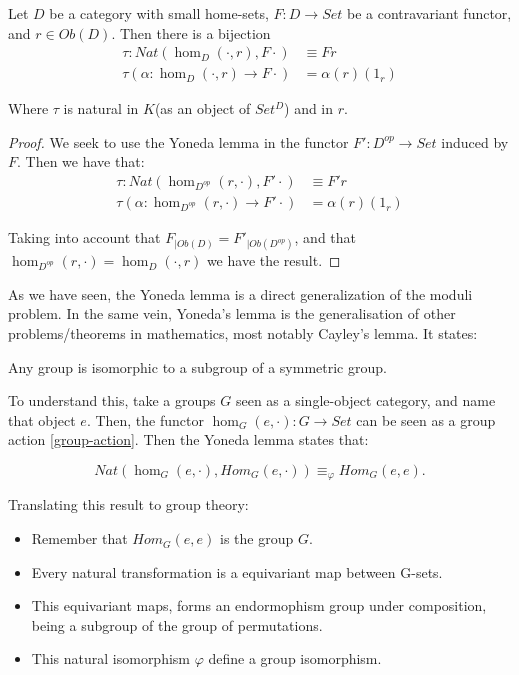 \begin{corollary}
  Let $D$ be a category with small home-sets, $F:D\to Set$ be a contravariant functor, and $r\in Ob(D)$. Then there is a bijection
  \begin{align*}
    \tau:Nat(\hom_D(\cdot,r), F\cdot) &\equiv Fr\\
    \tau(\alpha:\hom_D(\cdot,r)\to F\cdot)& = \alpha(r)(1_r)
  \end{align*}
  
  Where $\tau$ is natural in $K$(as an object of $Set^{D}$) and in $r$.
\end{corollary}
\begin{proof}
We seek to use the Yoneda lemma in the functor $F':D^{op}\to Set$ induced by $F$. Then we have that: 
  \begin{align*}
    \tau:Nat(\hom_{D^{op}}(r,\cdot), F'\cdot) &\equiv F'r\\
    \tau(\alpha:\hom_{D^{op}}(r,\cdot)\to F'\cdot)& = \alpha(r)(1_r)
  \end{align*}

  Taking into account that $F_{|Ob(D)}=F'_{|Ob(D^{op})}$, and that 
  $\hom_{D^{op}}(r,\cdot) = \hom_D(\cdot,r)$ we have the result.
\end{proof}

As we have seen, the Yoneda lemma is a direct generalization of the moduli problem. In the same vein, Yoneda's lemma is the generalisation of other problems/theorems in mathematics, most notably Cayley's lemma. It states:
\begin{proposition} \label{Cayleys}
Any group is isomorphic to a subgroup of a symmetric group.
\end{proposition}

To understand this, take a groups $G$ seen as a single-object category, and name that object $e$. Then, the functor $\hom_G(e, \cdot): G \to Set$ can be seen as a group action \ref{group-action}. Then the Yoneda lemma states that:

$$Nat(\hom_G(e,\cdot), Hom_G(e,\cdot)) \equiv_\varphi Hom_G(e,e).$$

Translating this result to group theory:
\begin{itemize}
\item Remember that $Hom_G(e,e)$ is the group $G$.
\item Every natural transformation is a equivariant map between G-sets.
\item This equivariant maps, forms an endormophism group under composition, being a subgroup of the group of permutations.
\item This natural isomorphism $\varphi$ define a group isomorphism.
\end{itemize}

